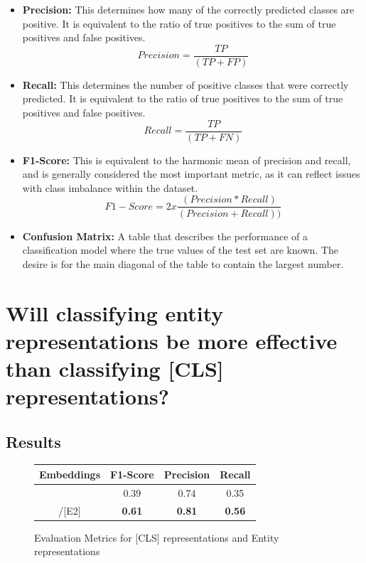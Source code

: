 \documentclass{l4proj}
\begin{document}
\begin{itemize}
    \item \textbf{Precision:} This determines how many of the correctly predicted classes are positive. It is equivalent to the ratio of true positives to the sum of true positives and false positives.
    \begin{equation}
    Precision = \frac{TP}{(TP + FP)}
    \end{equation}
    \item \textbf{Recall:} This determines the number of positive classes that were correctly predicted. It is equivalent to the ratio of true positives to the sum of true positives and false positives. 
    \begin{equation}
    Recall = \frac{TP}{(TP + FN)}
    \end{equation}
    \item \textbf{F1-Score:} This is equivalent to the harmonic mean of precision and recall, and is generally considered the most important metric, as it can reflect issues with class imbalance within the dataset.
    \begin{equation}
    F1-Score = 2 x \frac{(Precision*Recall)}{(Precision + Recall))}
    \end{equation}
    \item \textbf{Confusion Matrix:} A table that describes the performance of a classification model where the true values of the test set are known. The desire is for the main diagonal of the table to contain the largest number.
\end{itemize}

\section{Will classifying entity representations be more effective than classifying [CLS] representations?}

\subsection{Results}
\begin{figure}[h]
\begin{center}
\begin{tabular}{||c c c c||} 
 \hline
 Embeddings & F1-Score & Precision & Recall \\ [0.5ex] 
 \hline\hline
 [CLS] & 0.39 & 0.74 & 0.35 \\ 
 \hline
 [E1]/[E2] & \textbf{0.61} & \textbf{0.81} & \textbf{0.56}\\
 \hline
\end{tabular}
\end{center}
\caption{Evaluation Metrics for [CLS] representations and Entity representations}
\label{fig:qn1}
\end{figure}
\end{document}
